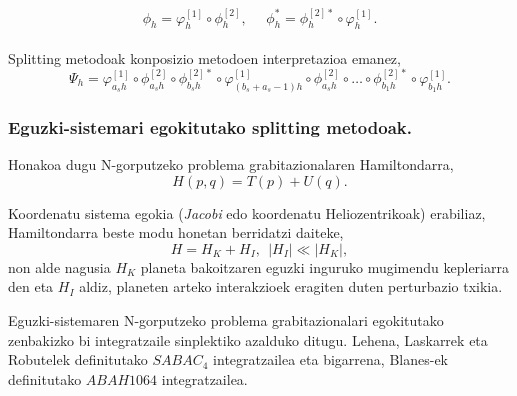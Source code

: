 \begin{equation*}
\phi_h=\varphi_h^{[1]} \circ \phi_h^{[2]}, \ \ \ \ \ \  \phi_h^{*}=\phi_h^{[2]*} \circ \varphi_h^{[1]}.
\end{equation*}


\paragraph*{} \emph{} Splitting metodoak konposizio metodoen interpretazioa emanez,
\begin{equation}
\Psi_h=\varphi^{[1]}_{a_{s} h} \circ \phi^{[2]}_{a_s h} \circ \phi^{[2]*}_{b_s h} \circ \varphi^{[1]}_{(b_s+a_s-1) h} \circ \phi^{[2]}_{a_s h} \circ \dots  \circ \phi^{[2]*}_{b_1 h} \circ \varphi^{[1]}_{b_1 h}.
\end{equation}


\subsubsection*{Eguzki-sistemari egokitutako splitting metodoak.}

Honakoa dugu N-gorputzeko problema grabitazionalaren Hamiltondarra,
\begin{equation*}
H(p,q)=T(p)+U(q).
\end{equation*}

Koordenatu sistema egokia (\emph{Jacobi} edo koordenatu Heliozentrikoak) erabiliaz,  Hamiltondarra beste modu honetan berridatzi daiteke,
\begin{equation*}
H=H_K+H_I,  \ \ |H_I|\ll|H_K|,
\end{equation*}
non alde nagusia $H_K$ planeta bakoitzaren eguzki inguruko mugimendu kepleriarra den eta $H_I$ aldiz, planeten arteko interakzioek eragiten duten perturbazio txikia.    

Eguzki-sistemaren N-gorputzeko problema grabitazionalari egokitutako zenbakizko bi integratzaile sinplektiko azalduko ditugu. Lehena, Laskarrek eta Robutelek \cite{Laskar2001} definitutako \emph{$SABAC_4$} integratzailea eta bigarrena, Blanes-ek \cite{Blanes2013} \cite{Farres2013} definitutako \emph{$ABAH1064$} integratzailea. 

